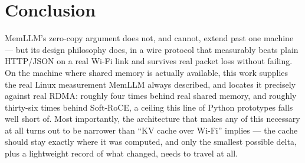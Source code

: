 \documentclass[11pt]{article}
\begin{document}
\section{Conclusion}

MemLLM's zero-copy argument does not, and cannot, extend past one machine --- but its design philosophy does, in a wire protocol that measurably beats plain HTTP/JSON on a real Wi-Fi link and survives real packet loss without failing. On the machine where shared memory is actually available, this work supplies the real Linux measurement MemLLM always described, and locates it precisely against real RDMA: roughly four times behind real shared memory, and roughly thirty-six times behind Soft-RoCE, a ceiling this line of Python prototypes falls well short of. Most importantly, the architecture that makes any of this necessary at all turns out to be narrower than ``KV cache over Wi-Fi'' implies --- the cache should stay exactly where it was computed, and only the smallest possible delta, plus a lightweight record of what changed, needs to travel at all.
\end{document}
